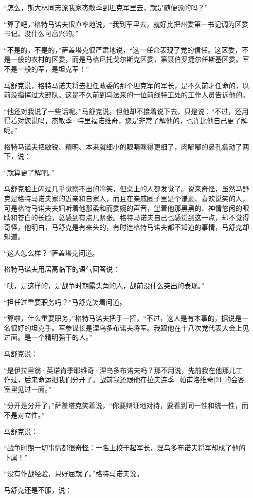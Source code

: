 “怎么，斯大林同志派我家杰敏季到坦克军里去，就是随便派的吗？”

“算了吧，”格特马诺夫很直率地说，“我到军里去，就好比把州委第一书记调为区委书记。没什么可高兴的。”

“不是的，不是的，”萨盖塔克很严肃地说，“这一任命表现了党的信任。这区委，不是一般的农村的区委，而是马格尼托戈尔斯克区委，第聂伯罗捷尔任斯基区委。军不是一般的军，是坦克军！”

马舒克说，格特马诺夫将去担任政委的那个坦克军的军长，是不久前才任命的，以前没指挥过大部队。这是不久前到乌法来的一位前线特工处的工作人员告诉他的。

“他还对我说了一些话呢。”马舒克说。但他却不接着说下去，只是说：“不过，还用得着对您说吗，杰敏季·特里福诺维奇，您是非常了解他的，也许比他自己更了解呢。”

格特马诺夫把敏锐、精明、本来就细小的眼睛眯得更细了，肉嘟嘟的鼻孔翕动了两下，说：

“就算更了解吧。”

马舒克脸上闪过几乎觉察不出的冷笑，但桌上的人都发觉了。说来奇怪，虽然马舒克是格特马诺夫家的近亲和自家人，而且在亲戚圈子里是个谦逊、喜欢说笑的人，可是格特马诺夫夫妇听着他那柔和而委婉的声音，望着他那黑黑的、神情悠闲的眼睛和苍白的长脸，总感到有点儿紧张。格特马诺夫自己也感觉到这一点，却不觉得奇怪，他明白，马舒克是有来头的，有时连格特马诺夫都不知道的事情，马舒克却知道。

“这人怎么样？”萨盖塔克问道。

格特马诺夫用居高临下的语气回答说：

“噢，是这样的，是战争时期露头角的人，战前没什么突出的表现。”

“担任过重要职务吗？”马舒克笑着问道。

“算啦，什么重要职务，”格特马诺夫把手一挥，“不过，这人是有本事的，据说是一名很好的坦克手。军参谋长是涅乌多布诺夫将军。我跟他在十八次党代表大会上见过面。是一个精明强干的人。”

马舒克说：

“是伊拉里翁·英诺肯季耶维奇·涅乌多布诺夫吗？那不用说，先前我在他那儿工作过，后来命运把我们分开了。战前我还跟他在拉夫连季·帕甫洛维奇[21]的会客室里见过一面。”

“分开是分开了，”萨盖塔克笑着说，“你要辩证地对待，要看到同一性和统一性，而不是对立性。”

马舒克说：

“战争时期一切事情都很奇怪：一名上校干起军长，涅乌多布诺夫将军却成了他的下属！”

“没有作战经验，只好屈就了。”格特马诺夫说。

马舒克还是不服，说：


